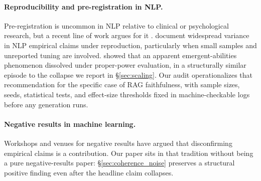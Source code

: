 \paragraph{Reproducibility and pre-registration in NLP.}
Pre-registration is uncommon in NLP relative to clinical or
psychological research, but a recent line of work argues for it
\citep{vandeven2020preregistration,ulmer2022preregister}.
\citet{rogers2023reviewing} document widespread variance in NLP
empirical claims under reproduction, particularly when small
samples and unreported tuning are involved. \citet{schaeffer2023emergent}
showed that an apparent emergent-abilities phenomenon dissolved under
proper-power evaluation, in a structurally similar episode to the
collapse we report in \S\ref{sec:scaling}.
Our audit operationalizes that recommendation for the specific
case of RAG faithfulness, with sample sizes, seeds, statistical
tests, and effect-size thresholds fixed in machine-checkable logs
before any generation runs.

\paragraph{Negative results in machine learning.}
Workshops and venues for negative results
\citep{negativeresults2024} have argued that disconfirming
empirical claims is a contribution. Our paper sits in that tradition
without being a pure negative-results paper: \S\ref{sec:coherence_noise}
preserves a structural positive finding even after the headline
claim collapses.
